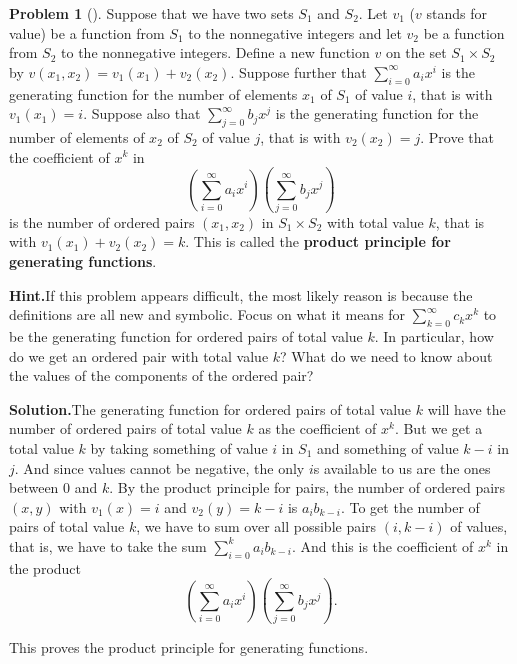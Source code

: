 \documentclass[10pt,]{book}
\newcommand{\terminology}[1]{\textbf{#1}}
\theoremstyle{plain}
\theoremstyle{definition}
\newtheorem{activity}[project]{Problem}
\theoremstyle{definition}
\numberwithin{equation}{chapter}
\begin{document}
\begin{activity}[]\label{ProductPrincipleOGF}
Suppose that we have two sets \(S_1\) and \(S_2\). Let \(v_1\) (\(v\) stands for value) be a function from \(S_1\) to the nonnegative integers and let \(v_2\) be a function from \(S_2\) to the nonnegative integers.  Define a new function \(v\) on the set \(S_1 \times S_2\) by \(v(x_1,x_2) = v_1(x_1) +v_2(x_2)\). Suppose further that \(\sum_{i=0}^\infty a_ix^i\) is the generating function for the number of elements \(x_1\) of \(S_1\) of value \(i\), that is with \(v_1(x_1)=i\). Suppose also that \(\sum_{j=0}^\infty b_j x^j\) is the generating function for the number of elements of \(x_2\) of \(S_2\) of value \(j\), that is with \(v_2(x_2) = j\).  Prove that the coefficient of \(x^k\) in%
\begin{equation*}
\left(\sum_{i=0}^\infty a_ix^i\right)\left(\sum_{j=0}^\infty
b_jx^j\right)
\end{equation*}
is the number of ordered pairs \((x_1,x_2)\) in \(S_1\times S_2\) with total value \(k\), that is with \(v_1(x_1) +v_2(x_2) =k\). This is called the \terminology{product principle for generating functions}.%
\par\medskip\noindent%
\textbf{Hint.}\quad If this problem appears difficult, the most likely reason is because the definitions are all new and symbolic. Focus on what it means for \(\sum_{k=0}^\infty c_kx^k\) to be the generating function for ordered pairs of total value \(k\). In particular, how do we get an ordered pair with total value \(k\)? What do we need to know about the values of the components of the ordered pair?%
\par\medskip\noindent%
\textbf{Solution.}\quad The generating function for ordered pairs of total value \(k\) will have the number of ordered pairs of total value \(k\) as the coefficient of \(x^k\). But we get a total value \(k\) by taking something of value \(i\) in \(S_1\) and something of value \(k-i\) in \(j\). And since values cannot be negative, the only \(i\)s available to us are the ones between \(0\) and \(k\). By the product principle for pairs, the number of ordered pairs \((x,y)\) with \(v_1(x)=i\) and \(v_2(y)=k-i\) is \(a_ib_{k-i}\). To get the number of pairs of total value \(k\), we have to sum over all possible pairs \((i,k-i)\) of values, that is, we have to take the sum \(\sum_{i=0}^k a_ib_{k-i}\). And this is the coefficient of \(x^k\) in the product%
\begin{equation*}
\left(\sum_{i=0}^\infty a_ix^i\right)\left(\sum_{j=0}^\infty
b_jx^j\right).
\end{equation*}
%
\par
This proves the product principle for generating functions.%
\end{activity}
\end{document}
